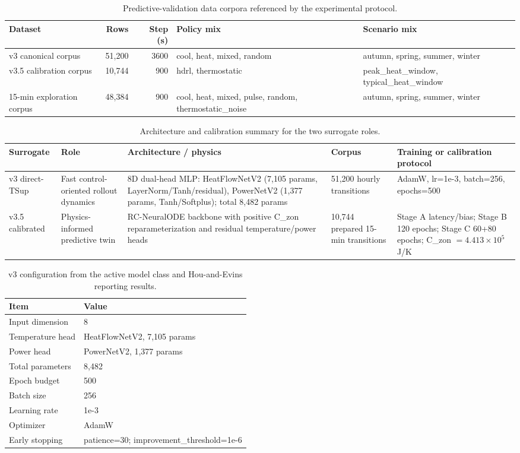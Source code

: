 \documentclass[11pt,a4paper]{article}
\begin{document}
\begin{table}[H]
\centering
\small
\caption{Predictive-validation data corpora referenced by the experimental protocol.}
\label{tab:block1-corpora}
\begin{tabularx}{\linewidth}{lrrXX}
\toprule
Dataset & Rows & Step (s) & Policy mix & Scenario mix \\
\midrule
v3 canonical corpus & 51,200 & 3600 & cool, heat, mixed, random & autumn, spring, summer, winter \\
v3.5 calibration corpus & 10,744 & 900 & hdrl, thermostatic & peak\_heat\_window, typical\_heat\_window \\
15-min exploration corpus & 48,384 & 900 & cool, heat, mixed, pulse, random, thermostatic\_noise & autumn, spring, summer, winter \\
\bottomrule
\end{tabularx}
\end{table}
\begin{table}[H]
\centering
\scriptsize
\caption{Architecture and calibration summary for the two surrogate roles.}
\label{tab:architecture-summary}
\begin{tabularx}{\linewidth}{lXXXX}
\toprule
Surrogate & Role & Architecture / physics & Corpus & Training or calibration protocol \\
\midrule
v3 direct-TSup & Fast control-oriented rollout dynamics & 8D dual-head MLP: HeatFlowNetV2 (7,105 params, LayerNorm/Tanh/residual), PowerNetV2 (1,377 params, Tanh/Softplus); total 8,482 params & 51,200 hourly transitions & AdamW, lr=1e-3, batch=256, epochs=500 \\
v3.5 calibrated & Physics-informed predictive twin & RC-NeuralODE backbone with positive C\_zon reparameterization and residual temperature/power heads & 10,744 prepared 15-min transitions & Stage A latency/bias; Stage B 120 epochs; Stage C 60+80 epochs; C\_zon $=4.413\times10^5$ J/K \\
\bottomrule
\end{tabularx}
\end{table}
\begin{table}[H]
\centering
\small
\caption{v3 configuration from the active model class and Hou-and-Evins reporting results.}
\label{tab:v3-config}
\begin{tabularx}{0.86\linewidth}{lX}
\toprule
Item & Value \\
\midrule
Input dimension & 8 \\
Temperature head & HeatFlowNetV2, 7,105 params \\
Power head & PowerNetV2, 1,377 params \\
Total parameters & 8,482 \\
Epoch budget & 500 \\
Batch size & 256 \\
Learning rate & 1e-3 \\
Optimizer & AdamW \\
Early stopping & patience=30; improvement\_threshold=1e-6 \\
\bottomrule
\end{tabularx}
\end{table}
\end{document}
